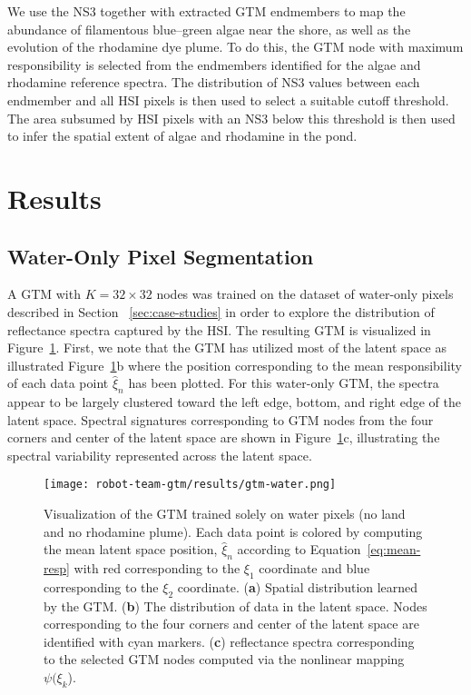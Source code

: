 We use the NS3 together with extracted GTM endmembers to map the abundance of filamentous blue--green algae near the shore, as well as the evolution of the rhodamine dye plume. To do this, the GTM node with maximum responsibility is selected from the endmembers identified for the algae and rhodamine reference spectra. The distribution of NS3 values between each endmember and all HSI pixels is then used to select a suitable cutoff threshold. The area subsumed by HSI pixels with an NS3 below this threshold is then used to infer the spatial extent of algae and rhodamine in the pond. 




\section{Results}



\subsection{Water-Only Pixel Segmentation}


A GTM with $K=32\times 32$ nodes was trained on the dataset of water-only pixels described in Section ~\ref{sec:case-studies} in order to explore the distribution of reflectance spectra captured by the HSI. The resulting GTM is visualized in Figure~\ref{fig:gtm-water}. First, we note that the GTM has utilized most of the latent space as illustrated  Figure~\ref{fig:gtm-water}b where the position corresponding to the mean responsibility of each data point $\hat{\xi}_n$ has been plotted. For this water-only GTM, the spectra appear to be largely clustered toward the left edge, bottom, and right edge of the latent space. Spectral signatures corresponding to GTM nodes from the four corners and center of the latent space are shown in Figure~\ref{fig:gtm-water}c, illustrating the spectral variability represented across the latent space. 

\begin{figure}[H]
  \centering
  \texttt{[image: robot-team-gtm/results/gtm-water.png]}
  \caption{Visualization of the GTM trained solely on water pixels (no land and
    no rhodamine plume). Each data point is colored by computing the mean latent
    space position, $\hat{\xi}_n$ according to Equation~\eqref{eq:mean-resp}
    with red corresponding to the $\xi_1$ coordinate and blue corresponding to
    the $\xi_2$ coordinate. (\textbf{a}) Spatial distribution learned by the
    GTM. (\textbf{b}) The distribution of data in the latent space. Nodes
    corresponding to the four corners and center of the latent space are
    identified with cyan markers. (\textbf{c}) reflectance spectra corresponding
    to the selected GTM nodes computed via the nonlinear mapping
    $\psi(\xi_k$).}
  \label{fig:gtm-water}
\end{figure}

